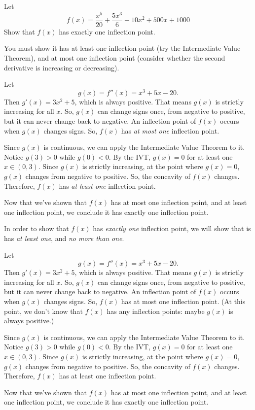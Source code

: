 \begin{Mquestion}[1997A]\label{s3.6.3proof1}
Let
\[f(x)=\frac{x^5}{20}+\frac{5x^3}{6}-10x^2+500x+1000\]
Show that $f(x)$ has exactly one inflection point.
\end{Mquestion}
\begin{hint}
You must show it has at least one inflection point (try the Intermediate Value Theorem), and at most one inflection point (consider whether the second derivative is increasing or decreasing).
\end{hint}
\begin{answer}
Let \[g(x)=f''(x)=x^3+5x-20.\] Then $g'(x)=3x^2+5$, which is always positive. That means $g(x)$ is strictly increasing for all $x$. So, $g(x)$ can change signs once, from negative to positive, but it can never change back to negative. An inflection point of $f(x)$ occurs when $g(x)$ changes signs. So, $f(x)$ has \emph{at most one} inflection point.

Since $g(x)$ is continuous, we can apply the Intermediate Value Theorem to it. Notice
$g(3)>0$ while $g(0)<0$. By the IVT, $g(x)=0$ for at least one $x \in (0,3)$. Since $g(x)$ is strictly increasing, at the point where $g(x)=0$, $g(x)$ changes from negative to positive. So, the concavity of $f(x)$ changes. Therefore, $f(x)$ has \emph{at least one} inflection point.

Now that we've shown that $f(x)$ has at most one inflection point, and at least one inflection point, we conclude it has exactly one inflection point.\end{answer}
\begin{solution}
In order to show that $f(x)$ has \emph{exactly one} inflection point, we will show that is has \emph{at least one}, and \emph{no more than one}.

Let \[g(x)=f''(x)=x^3+5x-20.\] Then $g'(x)=3x^2+5$, which is always positive. That means $g(x)$ is strictly increasing for all $x$. So, $g(x)$ can change signs once, from negative to positive, but it can never change back to negative. An inflection point of $f(x)$ occurs when $g(x)$ changes signs. So, $f(x)$ has at most one inflection point. (At this point, we don't know that $f(x)$ has any inflection points: maybe $g(x)$ is always positive.)

Since $g(x)$ is continuous, we can apply the Intermediate Value Theorem to it. Notice
$g(3)>0$ while $g(0)<0$. By the IVT, $g(x)=0$ for at least one $x \in (0,3)$. Since $g(x)$ is strictly increasing, at the point where $g(x)=0$, $g(x)$ changes from negative to positive. So, the concavity of $f(x)$ changes. Therefore, $f(x)$ has at least one inflection point.

Now that we've shown that $f(x)$ has at most one inflection point, and at least one inflection point, we conclude it has exactly one inflection point.
\end{solution}



